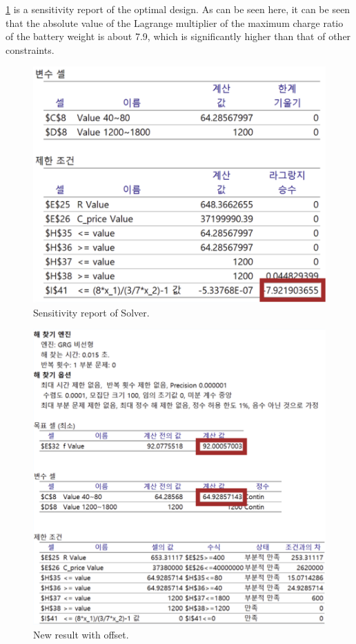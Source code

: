\documentclass[11pt,twocolumn]{article}
\begin{document}
            \cref{sense1} is a sensitivity report of the optimal design.
            As can be seen here, it can be seen that the absolute value of the Lagrange multiplier of the maximum charge ratio of the battery weight is about 7.9, which is significantly higher than that of other constraints.
            \begin{figure}[h]
                \centering
                    \centering
                    \includegraphics[width=.8\columnwidth]{Excel77.png}
                    \caption{Sensitivity report of Solver.}
                    \label{sense1}
            \end{figure}
            \begin{figure}[h]
                    \centering
                    \includegraphics[width=.8\columnwidth]{Excel88.png}
                    \caption{New result with offset.}
                    \label{sense2}
            \end{figure}
\end{document}
